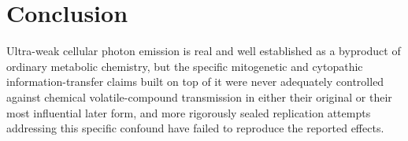 \documentclass[11pt]{article}
\begin{document}
\section{Conclusion}

Ultra-weak cellular photon emission is real and well established as a byproduct of ordinary metabolic chemistry, but the specific mitogenetic and cytopathic information-transfer claims built on top of it were never adequately controlled against chemical volatile-compound transmission in either their original or their most influential later form, and more rigorously sealed replication attempts addressing this specific confound have failed to reproduce the reported effects.
\end{document}
